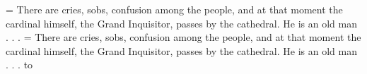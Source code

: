 \def\tstoryA{There are cries, sobs, confusion among the people, and at
that moment the cardinal himself, the Grand Inquisitor, passes by the
cathedral. He is an old man . . .}
\def\tstoryB{There are cries, sobs, confusion a\-mong the p\-eople, and
at that moment the cardinal himself, the Grand Inquisitor, passes by
the cathedral. He is an old man . . .}
=\vbox{\hsize=2.25in \tstoryA}
=\vbox{\hsize=2.25in \tstoryB}
\hbox to 
\bye
